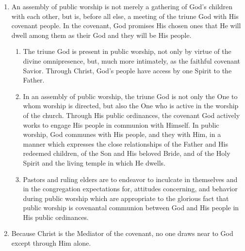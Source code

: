 \documentclass[
]{book}
\providecommand{\tightlist}{%
  \setlength{\itemsep}{0pt}\setlength{\parskip}{0pt}}
\begin{document}
\begin{enumerate}
\def\labelenumi{\arabic{enumi}.}
\tightlist
\item
  \protect\hypertarget{51}{\href{}{}}An assembly of public worship is not merely a gathering of God's children with each other, but is, before all else, a meeting of the triune God with His covenant people. In the covenant, God promises His chosen ones that He will dwell among them as their God and they will be His people.

  \begin{enumerate}
  \def\labelenumii{\alph{enumii}.}
  \tightlist
  \item
    The triune God is present in public worship, not only by virtue of the divine omnipresence, but, much more intimately, as the faithful covenant Savior. Through Christ, God's people have access by one Spirit to the Father.
  \item
    In an assembly of public worship, the triune God is not only the One to whom worship is directed, but also the One who is active in the worship of the church. Through His public ordinances, the covenant God actively works to engage His people in communion with Himself. In public worship, God communes with His people, and they with Him, in a manner which expresses the close relationships of the Father and His redeemed children, of the Son and His beloved Bride, and of the Holy Spirit and the living temple in which He dwells.
  \item
    Pastors and ruling elders are to endeavor to inculcate in themselves and in the congregation expectations for, attitudes concerning, and behavior during public worship which are appropriate to the glorious fact that public worship is covenantal communion between God and His people in His public ordinances.
  \end{enumerate}
\item
  Because Christ is the Mediator of the covenant, no one draws near to God except through Him alone.


\end{enumerate}
\end{document}
